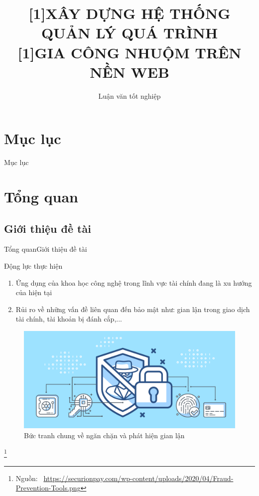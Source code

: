 \documentclass[
	10pt,                %
	aspectratio=169,     %
]{beamer}
\title
	[Xây dựng hệ thống quản lý quá trình gia công nhuộm cho một doanh nghiệp vải sợi trên nền web]%
	{\scalebox{.84}[1]{XÂY DỰNG HỆ THỐNG QUẢN LÝ QUÁ TRÌNH}\\\scalebox{.84}[1]{GIA CÔNG NHUỘM TRÊN NỀN WEB}\\}
\subtitle
	{Luận văn tốt nghiệp}%
\institute
	[Khoa KH - KT Máy tính\\Đại học Bách Khoa]%
	{Khoa Khoa học - Kỹ thuật Máy tính\\Đại học Bách Khoa - Đại học quốc gia TP.HCM}
\newcommand\footnotesource[1]{					%
	\vspace{-10mm}\let\thefootnote\relax\footnote{\hspace{-3mm}\tiny Nguồn:~#1}
}
\begin{document}
\begin{frame}[noframenumbering]
	\titlepage
\end{frame}

\section*{Mục lục}
	\begin{frame}{Mục lục}
		\hfill
		\parbox[c]{.98\textwidth}{
			\vspace{-3mm}
			\tableofcontents[hideallsubsections]%
		}
	\end{frame}

\section{Tổng quan}

\subsection{Giới thiệu đề tài}
	\begin{frame}{Tổng quan}{Giới thiệu đề tài}
	    \begin{block}{Động lực thực hiện}
			\begin{enumerate}
				\item Ứng dụng của khoa học công nghệ trong lĩnh vực tài chính đang là xu hướng của hiện tại
				\item Rủi ro về những vấn đề liên quan đến bảo mật như: gian lận trong giao dịch tài chính, tài khoản bị đánh cắp,...
			\end{enumerate}
		\end{block}
		\vspace{-0.2cm}
		\begin{figure}[h!]
			\includegraphics[scale=0.1]{figures/Fraud-Prevention-Tools.png}
			\caption{Bức tranh chung về ngăn chặn và phát hiện gian lận}
		\end{figure}
		\footnotesource{ \url{https://securionpay.com/wp-content/uploads/2020/04/Fraud-Prevention-Tools.png}}
	\end{frame}
\end{document}

